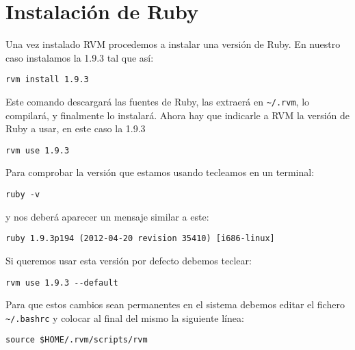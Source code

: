 \section{Instalación de Ruby }%
\label{section:exec}
Una vez instalado RVM procedemos a instalar una versión de Ruby. En nuestro caso instalamos la 1.9.3 tal que así:
\begin{verbatim}
rvm install 1.9.3
\end{verbatim}
Este comando descargará las fuentes de Ruby, las extraerá en \verb|~/.rvm|, lo compilará, y finalmente lo instalará.
Ahora hay que indicarle a RVM la versión de Ruby a usar, en este caso la 1.9.3
\begin{verbatim}
rvm use 1.9.3
\end{verbatim}
Para comprobar la versión que estamos usando tecleamos en un terminal:
\begin{verbatim}
ruby -v
\end{verbatim}
y nos deberá aparecer un mensaje similar a este:
\begin{verbatim}
ruby 1.9.3p194 (2012-04-20 revision 35410) [i686-linux]
\end{verbatim}
Si queremos usar esta versión por defecto debemos teclear:
\begin{verbatim}
rvm use 1.9.3 --default
\end{verbatim}
Para que estos cambios sean permanentes en el sistema debemos editar el fichero \verb|~/.bashrc| y colocar al final del mismo la siguiente línea:
\begin{verbatim}
source $HOME/.rvm/scripts/rvm
\end{verbatim}
